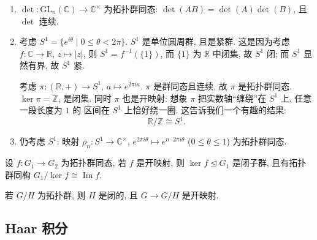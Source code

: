 \begin{example}\label{ex:top-hom}
\mbox{}\par\vspace{-0.2em}
\begin{enumerate}
  \item $\det\colon\mathrm{GL}_n(\mathbb{C})\to\mathbb{C}^{\times}$ 为拓扑群同态:
  $\det(AB)=\det(A)\det(B)$, 且 $\det$ 连续.
  \item 考虑 $S^1=\{e^{i\theta}\mid0\le\theta<2\pi\}$.
  $S^1$ 是单位圆周群, 且是紧群. 这是因为考虑 $f\colon\mathbb{C}\to\mathbb{R}$,
  $z\mapsto|z|$, 则 $S^1=f^{-1}(\{1\})$, 而 $\{1\}$ 为 $\mathbb{R}$ 中闭集, 故 $S^1$ 闭;
  而 $S^1$ 显然有界, 故 $S^1$ 紧.

  考虑 $\pi\colon(\mathbb{R},+)\to S^1$, $a\mapsto e^{2\pi ia}$.
  $\pi$ 是群同态且连续, 故 $\pi$ 是拓扑群同态. $\ker\pi=\mathbb{Z}$, 是闭集.
  同时 $\pi$ 也是开映射: 想象 $\pi$ 把实数轴``缠绕''在 $S^1$ 上, 任意一段长度为 $1$ 的
  区间在 $S^1$ 上恰好绕一圈. 这告诉我们一个有趣的结果:
  \[
    \mathbb{R}/\mathbb{Z}\cong S^1 .
  \]
  \item 仍考虑 $S^1$: 映射 $\rho_n\colon S^1\to\mathbb{C}^{\times}$,
  $e^{2\pi i\theta}\mapsto e^{n\cdot2\pi i\theta}$ ($0\le\theta\le1$) 为拓扑群同态.
\end{enumerate}
\end{example}

\begin{theorem}[拓扑群同态基本定理]\label{thm:top-hom-fundamental}
设 $f\colon G_1\to G_2$ 为拓扑群同态, 若 $f$ 是开映射, 则 $\ker f\trianglelefteq G_1$ 是闭子群,
且有拓扑群同构 $G_1/\ker f\cong\operatorname{Im}f$.
\end{theorem}

\begin{remark}\label{rem:quotient-closed-subgroup}
若 $G/H$ 为拓扑群, 则 $H$ 是闭的, 且 $G\to G/H$ 是开映射.
\end{remark}

\subsection{Haar 积分}

